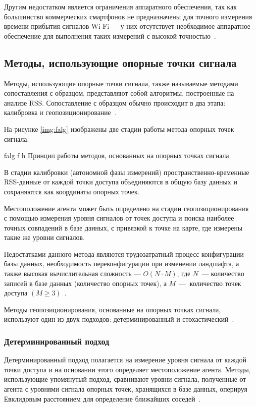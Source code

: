 Другим недостатком является ограничения аппаратного обеспечения, так как большинство коммерческих смартфонов не предназначены для точного измерения времени прибытия сигналов Wi-Fi --- у них отсутствует необходимое аппаратное обеспечение для выполнения таких измерений с высокой точностью~\cite{urban-info}.

\clearpage

\subsection{Методы, использующие опорные точки сигнала}

Методы, использующие опорные точки сигнала, также называемые методами сопоставления с образцом, представляют собой алгоритмы, построенные на анализе RSS. Сопоставление с образцом обычно происходит в два этапа: калибровка и геопозиционирование~\cite{intro}.

На рисунке \ref{img:falg} изображены две стадии работы метода опорных точек сигнала.

    {falg}
    {f}
    {h}
    {\linewidth}
    {Принцип работы методов, основанных на опорных точках сигнала}

В стадии калибровки (автономной фазы измерений) пространственно-временные RSS-данные от каждой точки доступа объединяются в общую базу данных и сохраняются как координаты опорных точек.

Местоположение агента может быть определено на стадии геопозиционирования с помощью измерения уровня сигналов от точек доступа и поиска наиболее точных совпадений в базе данных, с привязкой к точке на карте, где измерены такие же уровни сигналов.

Недостатками данного метода являются трудозатратный процесс конфигурации базы данных, необходимость переконфигурации при изменении ландшафта, а также высокая вычислительная сложность --- $O(N\cdot M)$, где $N$~--- количество записей в базе данных (количество опорных точек), а $M$~---~количество точек доступа $(M \geq 3)$~\cite{fingerprint}.

Методы геопозиционирования, основанные на опорных точках сигнала, используют один из двух подходов: детерминированный и стохастический~\cite{intro}.

\subsubsection{Детерминированный подход}

Детерминированный подход полагается на измерение уровня сигнала от каждой точки доступа и на основании этого определяет местоположение агента. Методы, использующие упомянутый подход, сравнивают уровни сигнала, полученные от агента с уровнями сигнала опорных точек, хранящихся в базе данных, оперируя Евклидовым расстоянием для определение ближайших соседей~\cite{fingerprint}.

